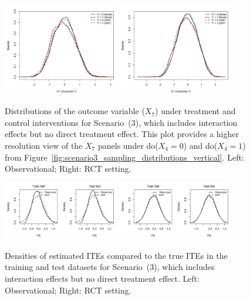 \begin{figure}[htbp]
\centering
\includegraphics[width=0.45\textwidth]{img/results/observ_scenario3_X7_treatment_densities.png}
\includegraphics[width=0.45\textwidth]{img/results/rct_scenario3_X7_treatment_densities.png}
\caption{Distributions of the outcome variable ($X_7$) under treatment and control interventions for Scenario~(3), which includes interaction effects but no direct treatment effect. This plot provides a higher resolution view of the $X_7$ panels under do($X_4 = 0$) and do($X_4 = 1$) from Figure~\ref{fig:scenario3_sampling_distributions_vertical}. Left: Observational; Right: RCT setting.}
\label{fig:scenario3_outcome_distributions}
\end{figure}




\begin{figure}[htbp]
\centering
\includegraphics[width=0.45\textwidth]{img/results/observ_scenario3_ITE_densities_train_test.png}
\includegraphics[width=0.45\textwidth]{img/results/rct_scenario3_ITE_densities_train_test.png}
\caption{Densities of estimated ITEs compared to the true ITEs in the training and test datasets for Scenario~(3), which includes interaction effects but no direct treatment effect. Left: Observational; Right: RCT setting.}
\label{fig:scenario3_ite_densities_train_test}
\end{figure}






